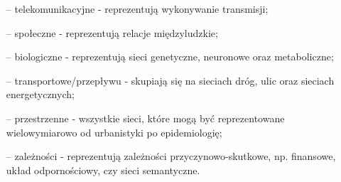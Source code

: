 \documentclass[12pt, twoside, final, openany]{mgr}
\begin{document}
\begin{itemize}
\begin{itemize}
	\item[--] telekomunikacyjne - reprezentują wykonywanie transmisji;
	\item[--] społeczne - reprezentują relacje międzyludzkie;
	\item[--] biologiczne - reprezentują sieci genetyczne, neuronowe oraz metaboliczne;
	\item[--] transportowe/przepływu - skupiają się na sieciach dróg, ulic oraz sieciach energetycznych;
	\item[--] przestrzenne - wszystkie sieci, które mogą być reprezentowane wielowymiarowo od urbanistyki po epidemiologię;
	\item[--] zależności - reprezentują zależności przyczynowo-skutkowe, np. finansowe, układ odpornościowy, czy sieci semantyczne.	
	\end{itemize}
\end{itemize}
\end{document}
